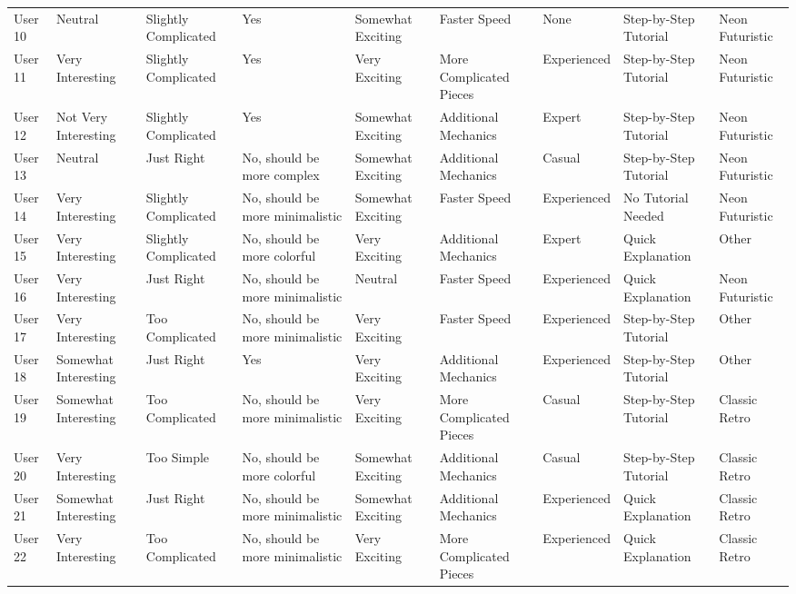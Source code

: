 \documentclass{article}
\begin{document}
\begin{landscape}
\begin{longtable}{lllllllll}
            User 10 & Neutral & Slightly Complicated & Yes & Somewhat Exciting & Faster Speed & None & Step-by-Step Tutorial & Neon Futuristic \\
            User 11 & Very Interesting & Slightly Complicated & Yes & Very Exciting & More Complicated Pieces & Experienced & Step-by-Step Tutorial & Neon Futuristic \\
            User 12 & Not Very Interesting & Slightly Complicated & Yes & Somewhat Exciting & Additional Mechanics & Expert & Step-by-Step Tutorial & Neon Futuristic \\
            User 13 & Neutral & Just Right & No, should be more complex & Somewhat Exciting & Additional Mechanics & Casual & Step-by-Step Tutorial & Neon Futuristic \\
            User 14 & Very Interesting & Slightly Complicated & No, should be more minimalistic & Somewhat Exciting & Faster Speed & Experienced & No Tutorial Needed & Neon Futuristic \\
            User 15 & Very Interesting & Slightly Complicated & No, should be more colorful & Very Exciting & Additional Mechanics & Expert & Quick Explanation & Other \\
            User 16 & Very Interesting & Just Right & No, should be more minimalistic & Neutral & Faster Speed & Experienced & Quick Explanation & Neon Futuristic \\
            User 17 & Very Interesting & Too Complicated & No, should be more minimalistic & Very Exciting & Faster Speed & Experienced & Step-by-Step Tutorial & Other \\
            User 18 & Somewhat Interesting & Just Right & Yes & Very Exciting & Additional Mechanics & Experienced & Step-by-Step Tutorial & Other \\
            User 19 & Somewhat Interesting & Too Complicated & No, should be more minimalistic & Very Exciting & More Complicated Pieces & Casual & Step-by-Step Tutorial & Classic Retro \\
            User 20 & Very Interesting & Too Simple & No, should be more colorful & Somewhat Exciting & Additional Mechanics & Casual & Step-by-Step Tutorial & Classic Retro \\
            User 21 & Somewhat Interesting & Just Right & No, should be more minimalistic & Somewhat Exciting & Additional Mechanics & Experienced & Quick Explanation & Classic Retro \\
            User 22 & Very Interesting & Too Complicated & No, should be more minimalistic & Very Exciting & More Complicated Pieces & Experienced & Quick Explanation & Classic Retro \\

\end{longtable}
\end{landscape}
\end{document}

